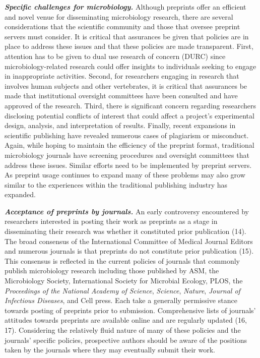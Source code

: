 \documentclass[11pt,]{article}
\begin{document}
\textbf{\emph{Specific challenges for microbiology.}} Although preprints
offer an efficient and novel venue for disseminating microbiology
research, there are several considerations that the scientific community
and those that oversee preprint servers must consider. It is critical
that assurances be given that policies are in place to address these
issues and that these policies are made transparent. First, attention
has to be given to dual use research of concern (DURC) since
microbiology-related research could offer insights to individuals
seeking to engage in inappropriate activities. Second, for researchers
engaging in research that involves human subjects and other vertebrates,
it is critical that assurances be made that institutional oversight
committees have been consulted and have approved of the research. Third,
there is significant concern regarding researchers disclosing potential
conflicts of interest that could affect a project's experimental design,
analysis, and interpretation of results. Finally, recent expansions in
scientific publishing have revealed numerous cases of plagiarism or
misconduct. Again, while hoping to maintain the efficiency of the
preprint format, traditional microbiology journals have screening
procedures and oversight committees that address these issues. Similar
efforts need to be implemented by preprint servers. As preprint usage
continues to expand many of these problems may also grow similar to the
experiences within the traditional publishing industry has expanded.

\textbf{\emph{Acceptance of preprints by journals.}} An early
controversy encountered by researchers interested in posting their work
as preprints as a stage in disseminating their research was whether it
constituted prior publication (14). The broad consensus of the
International Committee of Medical Journal Editors and numerous journals
is that preprints do not constitute prior publication (15). This
consensus is reflected in the current policies of journals that commonly
publish microbiology research including those published by ASM, the
Microbiology Society, International Society for Microbial Ecology, PLOS,
the \emph{Proceedings of the National Academy of Science},
\emph{Science}, \emph{Nature}, \emph{Journal of Infectious Diseases},
and Cell press. Each take a generally permissive stance towards posting
of preprints prior to submission. Comprehensive lists of journals'
attitudes towards preprints are available online and are regularly
updated (16, 17). Considering the relatively fluid nature of many of
these policies and the journals' specific policies, prospective authors
should be aware of the positions taken by the journals where they may
eventually submit their work.
\end{document}
